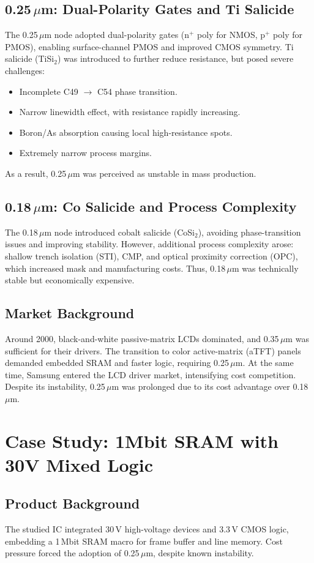 \documentclass[conference]{IEEEtran}
\begin{document}
\subsection{0.25\,$\mu$m: Dual-Polarity Gates and Ti Salicide}
The 0.25\,$\mu$m node adopted dual-polarity gates (n$^+$ poly for NMOS, p$^+$ poly for PMOS), enabling surface-channel PMOS and improved CMOS symmetry.  
Ti salicide (TiSi$_2$) was introduced to further reduce resistance, but posed severe challenges:  
\begin{itemize}
  \item Incomplete C49 $\rightarrow$ C54 phase transition.
  \item Narrow linewidth effect, with resistance rapidly increasing.
  \item Boron/As absorption causing local high-resistance spots.
  \item Extremely narrow process margins.
\end{itemize}
As a result, 0.25\,$\mu$m was perceived as unstable in mass production.

\subsection{0.18\,$\mu$m: Co Salicide and Process Complexity}
The 0.18\,$\mu$m node introduced cobalt salicide (CoSi$_2$), avoiding phase-transition issues and improving stability.  
However, additional process complexity arose: shallow trench isolation (STI), CMP, and optical proximity correction (OPC), which increased mask and manufacturing costs.  
Thus, 0.18\,$\mu$m was technically stable but economically expensive.

\subsection{Market Background}
Around 2000, black-and-white passive-matrix LCDs dominated, and 0.35\,$\mu$m was sufficient for their drivers.  
The transition to color active-matrix (aTFT) panels demanded embedded SRAM and faster logic, requiring 0.25\,$\mu$m.  
At the same time, Samsung entered the LCD driver market, intensifying cost competition. Despite its instability, 0.25\,$\mu$m was prolonged due to its cost advantage over 0.18\,$\mu$m.

\section{Case Study: 1Mbit SRAM with 30V Mixed Logic}
\subsection{Product Background}
The studied IC integrated 30\,V high-voltage devices and 3.3\,V CMOS logic, embedding a 1\,Mbit SRAM macro for frame buffer and line memory.  
Cost pressure forced the adoption of 0.25\,$\mu$m, despite known instability.
\end{document}
